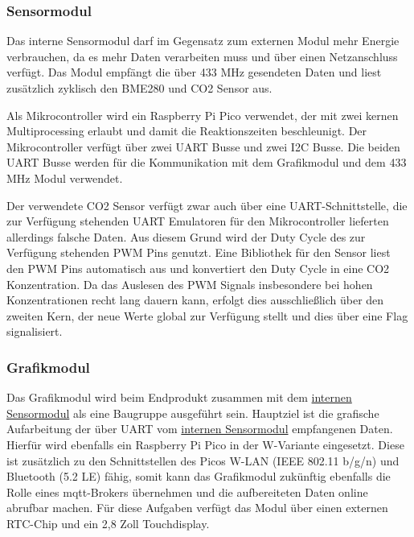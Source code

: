 \documentclass[a4paper,11pt]{article}
\begin{document}
\subsubsection{Sensormodul}
\label{subsubsub:sensormodulInt}

Das interne Sensormodul darf im Gegensatz zum externen Modul mehr Energie verbrauchen, da es mehr Daten verarbeiten muss und über einen Netzanschluss verfügt. 
Das Modul empfängt die über 433 MHz gesendeten Daten und liest zusätzlich zyklisch den BME280 und CO2 Sensor aus.

\vspace{0.3cm}
\noindent
Als Mikrocontroller wird ein Raspberry Pi Pico verwendet, der mit zwei kernen Multiprocessing erlaubt und damit die Reaktionszeiten beschleunigt. Der Mikrocontroller
verfügt über zwei UART Busse und zwei I2C Busse. Die beiden UART Busse werden für die Kommunikation mit dem Grafikmodul und dem 433 MHz Modul verwendet.

Der verwendete CO2 Sensor verfügt zwar auch über eine UART-Schnittstelle, die zur Verfügung stehenden UART Emulatoren für den Mikrocontroller lieferten allerdings
falsche Daten. Aus diesem Grund wird der Duty Cycle des zur Verfügung stehenden PWM Pins genutzt. 
Eine Bibliothek für den Sensor liest den PWM Pins automatisch aus und konvertiert den Duty Cycle in eine CO2 Konzentration. Da das Auslesen des PWM Signals insbesondere bei hohen
Konzentrationen recht lang dauern kann, erfolgt dies ausschließlich über den zweiten Kern, der neue Werte global zur Verfügung stellt und dies über eine Flag signalisiert. 

\subsubsection{Grafikmodul}
\label{subsubsub:grafikmodulInt}

Das Grafikmodul wird beim Endprodukt zusammen mit dem \hyperref[subsub:sensormodulInt]{internen Sensormodul} als eine Baugruppe ausgeführt sein.
Hauptziel ist die grafische Aufarbeitung der über UART vom \hyperref[subsub:sensormodulInt]{internen Sensormodul} empfangenen Daten.
Hierfür wird ebenfalls ein Raspberry Pi Pico in der W-Variante eingesetzt.
Diese ist zusätzlich zu den Schnittstellen des Picos W-LAN (IEEE 802.11 b/g/n) und Bluetooth (5.2 LE) fähig, somit kann das Grafikmodul zukünftig ebenfalls die Rolle eines mqtt-Brokers übernehmen und die aufbereiteten Daten online abrufbar machen.
Für diese Aufgaben verfügt das Modul über einen externen RTC-Chip und ein 2,8 Zoll Touchdisplay.
\end{document}
